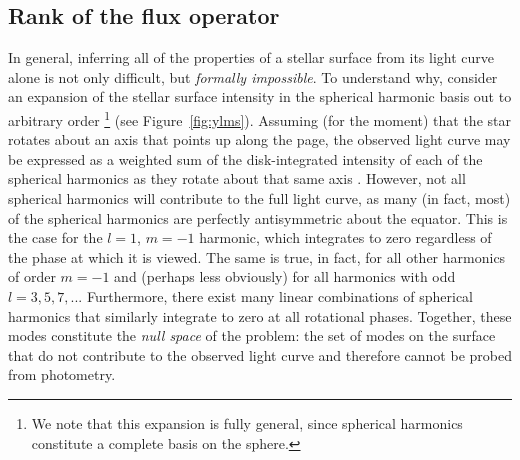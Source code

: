 \documentclass[modern,linenumbers]{aastex62}
\begin{document}
\subsection{Rank of the flux operator}
%
In general, inferring all of the properties of a stellar surface from its light curve alone
is not
only difficult, but \emph{formally impossible}. To understand why, consider
an expansion of the stellar surface intensity in the spherical
harmonic basis out to arbitrary order%
\footnote{%
    We note that this expansion is fully general, since spherical harmonics
    constitute a complete basis on the sphere.
} (see Figure~\ref{fig:ylms}).
Assuming (for the moment) that the
star rotates about an axis that points up along the page, the observed
light curve may be expressed as a weighted sum of the disk-integrated intensity
of each of the spherical harmonics as they rotate about that same axis \citep{Luger2019}.
However, not all spherical harmonics will contribute to the full light curve,
as many (in fact, most) of the spherical harmonics are perfectly antisymmetric
about the equator. This is the case for
the $l = 1$, $m = -1$ harmonic, which integrates to zero regardless of
the phase at which it is viewed. The same is true, in fact, for all other harmonics
of order $m = -1$ and (perhaps less obviously) for all harmonics with odd
$l = 3, 5, 7, ...$ Furthermore, there exist many linear combinations of
spherical harmonics that similarly integrate to zero at all rotational
phases. Together, these modes constitute the \emph{null space} of the problem:
the set of modes on the surface that do not contribute to the observed
light curve and therefore cannot be probed from photometry.
\end{document}
